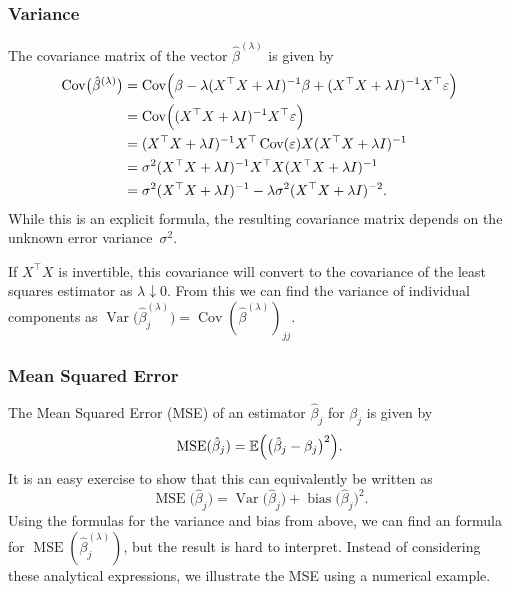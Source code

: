 \documentclass[
  a4paper,
]{article}
\theoremstyle{definition}
\theoremstyle{definition}
\theoremstyle{definition}
\theoremstyle{definition}
\theoremstyle{remark}
\begin{document}
\subsubsection{Variance}\label{variance}

The covariance matrix of the vector \(\hat\beta^{(\lambda)}\) is given
by
\begin{align*}
  \mathop{\mathrm{Cov}}\bigl(\hat\beta^{(\lambda)}\bigr)
  &= \mathop{\mathrm{Cov}}\Bigl(
      \beta
      - \lambda (X^\top X + \lambda I)^{-1} \beta
      + (X^\top X + \lambda I)^{-1} X^\top \varepsilon
    \Bigr) \\
  &= \mathop{\mathrm{Cov}}\Bigl(
      (X^\top X + \lambda I)^{-1} X^\top \varepsilon
    \Bigr) \\
  &= (X^\top X + \lambda I)^{-1} X^\top \mathop{\mathrm{Cov}}(\varepsilon) X (X^\top X + \lambda I)^{-1} \\
  &= \sigma^2 (X^\top X + \lambda I)^{-1} X^\top X (X^\top X + \lambda I)^{-1} \\
  &= \sigma^2 (X^\top X + \lambda I)^{-1} - \lambda \sigma^2 (X^\top X + \lambda I)^{-2}.
\end{align*}
While this is an explicit formula, the resulting covariance matrix
depends on the unknown error variance~\(\sigma^2\).

If \(X^\top X\) is invertible, this covariance will convert to the
covariance of the least squares estimator as \(\lambda \downarrow 0\).
From this we can find the variance of individual components
as \(\mathop{\mathrm{Var}}\bigl( \hat\beta^{(\lambda)}_j \bigr) =
\mathop{\mathrm{Cov}}( \hat\beta^{(\lambda)} )_{jj}\).

\subsubsection{Mean Squared Error}\label{mean-squared-error}

The Mean Squared Error (MSE) of an estimator \(\hat \beta_j\) for \(\beta_j\) is
given by
\begin{equation*}
  \mathop{\mathrm{MSE}}\nolimits( \hat\beta_j )
  = \mathbb{E}\Bigl( \bigl( \hat\beta_j - \beta_j \bigr)^2 \Bigr).
\end{equation*}
It is an easy exercise to show that this can equivalently be written as
\begin{equation*}
  \mathop{\mathrm{MSE}}\nolimits\bigl( \hat\beta_j \bigr)
  = \mathop{\mathrm{Var}}\bigl( \hat\beta_j \bigr) + \mathop{\mathrm{bias}}\bigl( \hat\beta_j \bigr)^2.
\end{equation*}
Using the formulas for the variance and bias from above, we
can find an formula for \(\mathop{\mathrm{MSE}}\nolimits(\hat\beta^{(\lambda)}_j)\),
but the result is hard to interpret. Instead of considering these analytical
expressions, we illustrate the MSE using a numerical
example.
\end{document}
